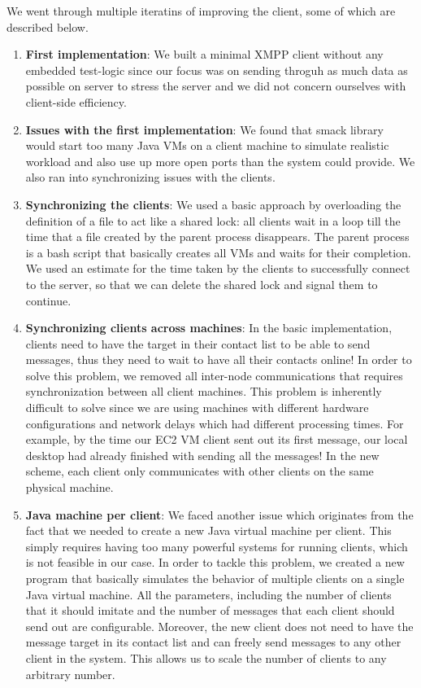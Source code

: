 \documentclass[a4paper, twocolumn]{article}
\begin{document}
We went through multiple iteratins of improving the client, some of which are described below. 
\begin{enumerate}
\item \textbf{First implementation}: We built a minimal XMPP client without any embedded test-logic since our focus was on sending throguh as much data as possible on server to stress the server and we did not concern ourselves with client-side efficiency.

\item \textbf{Issues with the first implementation}: We found that smack library would start too many Java VMs on a client machine to simulate realistic workload and also use up more open ports than the system could provide. We also ran into synchronizing issues with the clients.

\item \textbf{Synchronizing the clients}: We used a basic approach by overloading the definition of a file to act like a shared lock: all clients wait in a loop till the time that a file created by the parent process disappears. The parent process is a bash script that basically creates all VMs and waits for their completion. We used an estimate for the time taken by the clients to successfully connect to the server, so that we can delete the shared lock and signal them to continue. 

\item \textbf{Synchronizing clients across machines}: In the basic implementation, clients need to have the target in their contact list to be able to send messages, thus they need to wait to have all their contacts online! In order to solve this problem, we removed all inter-node communications that requires synchronization between all client machines. This problem is inherently difficult to solve since we are using machines with different hardware configurations and network delays which had different processing times. For example, by the time our EC2 VM client sent out its first message, our local desktop had already finished with sending all the messages! In the new scheme, each client only communicates with other clients on the same physical machine.

\item \textbf{Java machine per client}: We faced another issue which originates from the fact that we needed to create a new Java virtual machine per client. This simply requires having too many powerful systems for running clients, which is not feasible in our case. In order to tackle this problem, we created a new program that basically simulates the behavior of multiple clients on a single Java virtual machine. All the parameters, including the number of clients that it should imitate and the number of messages that each client should send out are configurable. Moreover, the new client does not need to have the message target in its contact list and can freely send messages to any other client in the system. This allows us to scale the number of clients to any arbitrary number.
\end{enumerate}
\end{document}
